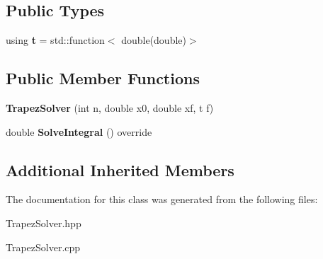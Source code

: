 \subsection*{Public Types}
\begin{DoxyCompactItemize}
\item 
\mbox{\label{class_trapez_solver_ac94a3e89df0d6bacc7d62e3784fd4162}} 
using {\bfseries t} = std\+::function$<$ double(double)$>$
\end{DoxyCompactItemize}
\subsection*{Public Member Functions}
\begin{DoxyCompactItemize}
\item 
\mbox{\label{class_trapez_solver_aacba017d146636c666dff931f6c43323}} 
{\bfseries Trapez\+Solver} (int n, double x0, double xf, t f)
\item 
\mbox{\label{class_trapez_solver_a15651e2fba081b87b484a83fc424c81d}} 
double {\bfseries Solve\+Integral} () override
\end{DoxyCompactItemize}
\subsection*{Additional Inherited Members}


The documentation for this class was generated from the following files\+:\begin{DoxyCompactItemize}
\item 
Trapez\+Solver.\+hpp\item 
Trapez\+Solver.\+cpp\end{DoxyCompactItemize}
